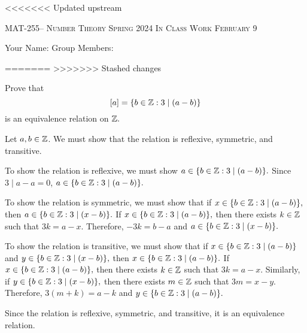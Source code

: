 \documentclass[handout]{ximera}
\date{February 9, 2024}
\date{\classday, 2024}
\begin{document}
\handoutAbstract
\maketitle
<<<<<<< Updated upstream
  \begin{center}%
    {\large \scshape MAT-255-- Number Theory \hfill Spring 2024 \hfill In Class Work February 9}%
    
    {\large
        Your Name: \hrulefill \quad Group Members:\hrulefill \quad \hrulefill
	\par}%
  \end{center}%
=======
>>>>>>> Stashed changes


\begin{br}
  Prove that \[[a]=\{b\in\mathbb Z: 3\mid(a-b)\}\] is an equivalence relation on $\mathbb Z.$

    \begin{solution}
        Let $a,b\in\mathbb Z$. We must show that the relation is reflexive, symmetric, and transitive.
  
        To show the relation is reflexive, we must show $a\in \{b\in\mathbb Z: 3\mid(a-b)\}.$ Since $3\mid a-a=0$, $a\in \{b\in\mathbb Z: 3\mid(a-b)\}.$
  
        To show the relation is symmetric, we must show that if $x\in \{b\in\mathbb Z: 3\mid(a-b)\},$ then $a\in \{b\in\mathbb Z: 3\mid(x-b)\}.$ If $x\in \{b\in\mathbb Z: 3\mid(a-b)\},$ then there exists $k\in\mathbb Z$ such that $3k=a-x.$ Therefore, $-3k=b-a$ and $a\in \{b\in\mathbb Z: 3\mid(x-b)\}.$
  
        To show the relation is transitive, we must show that if $x\in \{b\in\mathbb Z: 3\mid(a-b)\}$ and $y\in \{b\in\mathbb Z: 3\mid(x-b)\},$ then $x\in \{b\in\mathbb Z: 3\mid(a-b)\}.$ If $x\in \{b\in\mathbb Z: 3\mid(a-b)\},$ then there exists $k\in\mathbb Z$ such that $3k=a-x.$ 
        Similarly, if $y\in \{b\in\mathbb Z: 3\mid(x-b)\},$ then there exists $m\in\mathbb Z$ such that $3m=x-y.$ Therefore, $3(m+k)=a-k$ and $y\in \{b\in\mathbb Z: 3\mid(a-b)\}.$
        
        Since the relation is reflexive, symmetric, and transitive, it is an equivalence relation.
  \end{solution}
\end{br}


  
\end{document}
